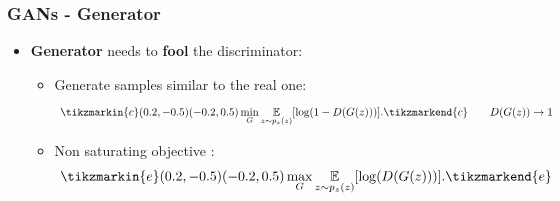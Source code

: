 \documentclass{beamer}
\begin{document}
{
	\begin{frame}[plain]
\end{frame}
}

\begin{frame}
	\frametitle{GANs - Generator}
	\begin{itemize}
		\item \textbf{Generator} needs to \textbf{fool} the discriminator:
		\begin{itemize}	
			\item<1-> \alert<+>{Generate samples similar to the real one:
			\begin{equation}
				\tikzmarkin{c}(0.2,-0.5)(-0.2,0.5)
				\min_G  \underset{z \sim p_z(z)}{\mathbb{E}}[\log(1 - D(G(z)))].
				\tikzmarkend{c}
				\tag*{$D(G(z)) \rightarrow 1$}
			\end{equation}}
				\item<2-> \alert<+>{Non saturating objective \citep{goodfellowGenerativeAdversarialNetworks2014}:
					\begin{equation}
					\tikzmarkin{e}(0.2,-0.5)(-0.2,0.5)
					\max_G  \underset{z \sim p_z(z)}{\mathbb{E}}[\log( D(G(z)))].
					\tikzmarkend{e}
				\end{equation}
				}
		\end{itemize}
	\end{itemize}

\end{frame}
\end{document}
